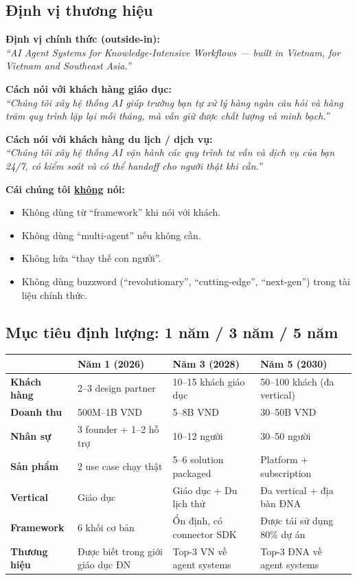 \documentclass[11pt,a4paper]{article}
\begin{document}
\subsection{Định vị thương hiệu}

\textbf{Định vị chính thức (outside-in):}\\
\textit{``AI Agent Systems for Knowledge-Intensive Workflows — built in Vietnam,
for Vietnam and Southeast Asia.''}

\textbf{Cách nói với khách hàng giáo dục:}\\
\textit{``Chúng tôi xây hệ thống AI giúp trường bạn tự xử lý hàng ngàn câu hỏi
và hàng trăm quy trình lặp lại mỗi tháng, mà vẫn giữ được chất lượng và
minh bạch.''}

\textbf{Cách nói với khách hàng du lịch / dịch vụ:}\\
\textit{``Chúng tôi xây hệ thống AI vận hành các quy trình tư vấn và dịch vụ
của bạn 24/7, có kiểm soát và có thể handoff cho người thật khi cần.''}

\textbf{Cái chúng tôi \underline{không} nói:}
\begin{itemize}
\item Không dùng từ ``framework'' khi nói với khách.
\item Không dùng ``multi-agent'' nếu không cần.
\item Không hứa ``thay thế con người''.
\item Không dùng buzzword (``revolutionary'', ``cutting-edge'', ``next-gen'') trong tài liệu chính thức.
\end{itemize}

\subsection{Mục tiêu định lượng: 1 năm / 3 năm / 5 năm}

\begin{tabularx}{\linewidth}{@{}p{1.8cm} X X X@{}}
\toprule
 & \textbf{Năm 1} (2026) & \textbf{Năm 3} (2028) & \textbf{Năm 5} (2030) \\
\midrule
\textbf{Khách hàng} & 2--3 design partner & 10--15 khách giáo dục & 50--100 khách (đa vertical) \\
\textbf{Doanh thu} & 500M--1B VND & 5--8B VND & 30--50B VND \\
\textbf{Nhân sự} & 3 founder + 1--2 hỗ trợ & 10--12 người & 30--50 người \\
\textbf{Sản phẩm} & 2 use case chạy thật & 5--6 solution packaged & Platform + subscription \\
\textbf{Vertical} & Giáo dục & Giáo dục + Du lịch thử & Đa vertical + địa bàn ĐNA \\
\textbf{Framework} & 6 khối cơ bản & Ổn định, có connector SDK & Được tái sử dụng 80\% dự án \\
\textbf{Thương hiệu} & Được biết trong giới giáo dục ĐN & Top-3 VN về agent systems & Top-3 ĐNA về agent systems \\
\bottomrule
\end{tabularx}
\end{document}
